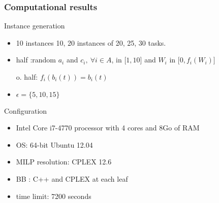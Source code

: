 \begin{frame}
  \frametitle{Computational results}
\vfill
  \begin{block}{Instance generation}
    \begin{itemize}
    \item 10 instances 10, 20 instances of 20, 25, 30 tasks. 
    \item half :random  $a_i$ and $c_i,\ \forall i \in A$, in ${[}1,10{]}$
      and $W_i$ in ${[}0,f_i(W_i){]}$

      o. half: $f_i(b_i(t))= b_i(t)$
    \item $\epsilon = \{5, 10, 15\}$ 
    \end{itemize}
  \end{block}
\vfill
\pause
  \begin{block}{Configuration}
    \begin{itemize}
    \item Intel Core i7-4770 processor with 4 cores and 8Go of RAM
    \item OS: 64-bit Ubuntu 12.04
    \item MILP resolution: CPLEX 12.6  
    \item BB : C++ and CPLEX at each leaf
    \item time limit: 7200 seconds
    \end{itemize}
  \end{block}
  \vfill
\end{frame}


